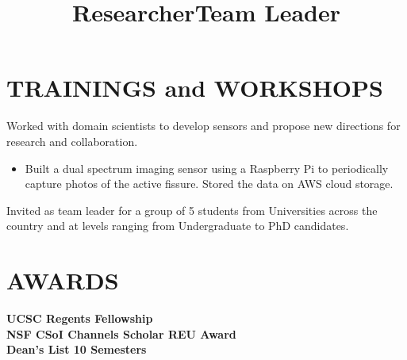 \documentclass[margin]{res}
\begin{document}
\begin{resume}
\section{TRAININGS and WORKSHOPS}
\title{\textbf{Researcher}}
\begin{position}
Worked with domain scientists to develop sensors and propose new directions for research and collaboration.
\begin{itemize}
\item Built a dual spectrum imaging sensor using a Raspberry Pi to periodically capture photos of the active fissure. Stored the data on AWS cloud storage.
\end{itemize}
\end{position}

\title{\textbf{Team Leader}}
\begin{position}
Invited as team leader for a group of 5 students from Universities across the country and at levels ranging from Undergraduate to PhD candidates.
\end{position}

\section{AWARDS}

\textbf{UCSC Regents Fellowship}
\\
\textbf{NSF CSoI Channels Scholar REU Award}
\\
\textbf{Dean’s List 10 Semesters}


\end{resume}
\end{document}
